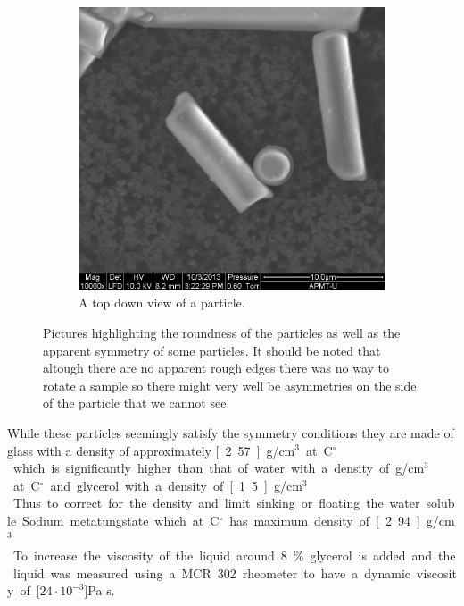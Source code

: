 \begin{figure}[H]
\begin{subfigure}[3b]{0.40\textwidth}
\includegraphics[width=\textwidth]{figures/method/round.png}
\caption{A top down view of a particle.}\label{fig:roundparticle}
\end{subfigure}
\caption{Pictures highlighting the roundness of the particles as well as the apparent symmetry of some particles. It should be noted that altough there are no apparent rough edges there was no way to rotate a sample so there might very well be asymmetries on the side of the particle that we cannot see.}
\label{fig:particlepictures2}
\end{figure}

While these particles seemingly satisfy the symmetry conditions they are made of glass with a density of approximately 
\unit[2.57]{g/cm$^3$} at \unit[20]{C$^\circ$} which is significantly higher than that of water with a density of 
\unit[1]{g/cm$^3$} at \unit[20]{C$^\circ$} and glycerol with a density of \unit[1.5]{g/cm$^3$}. Thus to correct for the 
density and limit sinking or floating the water soluble Sodium metatungstate which at \unit[20]{C$^\circ$} has maximum 
density of \unit[2.94]{g/cm$^3$}. To increase the viscosity of the liquid around 8\% glycerol is added and the liquid 
was measured using a MCR 302 rheometer to have a dynamic viscosity of \unit[$24\cdot 10^{-3}$]{Pa s}.
